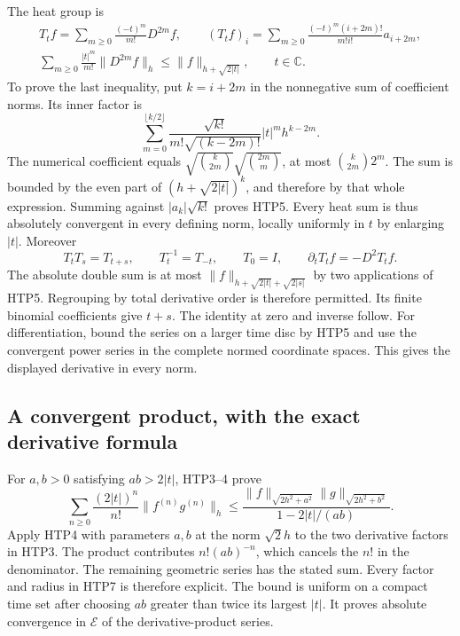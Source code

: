 The heat group is
\begin{equation}\tag{HTP5}
\begin{gathered}
 T_tf=\sum_{m\ge0}\frac{(-t)^m}{m!}D^{2m}f,\qquad
 (T_tf)_i=\sum_{m\ge0}\frac{(-t)^m(i+2m)!}{m!i!}a_{i+2m},\\
 \sum_{m\ge0}\frac{|t|^m}{m!}\|D^{2m}f\|_h
                       \le\|f\|_{h+\sqrt{2|t|}},\qquad t\in\mathbb C.
\end{gathered}
\end{equation}
To prove the last inequality, put $k=i+2m$ in the nonnegative
sum of coefficient norms. Its inner factor is
\[
 \sum_{m=0}^{\lfloor k/2\rfloor}
 \frac{\sqrt{k!}}{m!\sqrt{(k-2m)!}}|t|^m h^{k-2m}.
\]
The numerical coefficient equals
$\sqrt{\binom k{2m}}\sqrt{\binom{2m}m}$, at most
$\binom k{2m}2^m$. The sum is bounded by the even part of
$(h+\sqrt{2|t|})^k$, and therefore by that whole expression.
Summing against $|a_k|\sqrt{k!}$ proves HTP5.
Every heat sum is thus absolutely convergent in every defining
norm, locally uniformly in $t$ by enlarging $|t|$.
Moreover
\begin{equation}\tag{HTP6}
 T_tT_s=T_{t+s},\qquad T_t^{-1}=T_{-t},\qquad T_0=I,
 \qquad \partial_tT_tf=-D^2T_tf.
\end{equation}
The absolute double sum is at most
$\|f\|_{h+\sqrt{2|t|}+\sqrt{2|s|}}$ by two applications of
HTP5. Regrouping by total derivative order is therefore
permitted. Its finite binomial coefficients give $t+s$.
The identity at zero and inverse follow. For differentiation,
bound the series on a larger time disc by HTP5 and use the
convergent power series in the complete normed coordinate
spaces. This gives the displayed derivative in every norm.

\subsection{A convergent product, with the exact derivative formula}

For $a,b>0$ satisfying $ab>2|t|$, HTP3--4 prove
\begin{equation}\tag{HTP7}
 \sum_{n\ge0}\frac{(2|t|)^n}{n!}\|f^{(n)}g^{(n)}\|_h
 \le\frac{\|f\|_{\sqrt{2h^2+a^2}}
             \|g\|_{\sqrt{2h^2+b^2}}}{1-2|t|/(ab)}.
\end{equation}
Apply HTP4 with parameters $a,b$ at the norm $\sqrt2h$ to
the two derivative factors in HTP3. The product contributes
$n!(ab)^{-n}$, which cancels the $n!$ in the denominator.
The remaining geometric series has the stated sum. Every
factor and radius in HTP7 is therefore explicit. The bound
is uniform on a compact time set after choosing $ab$ greater
than twice its largest $|t|$. It proves absolute convergence
in $\mathcal E$ of the derivative-product series.

